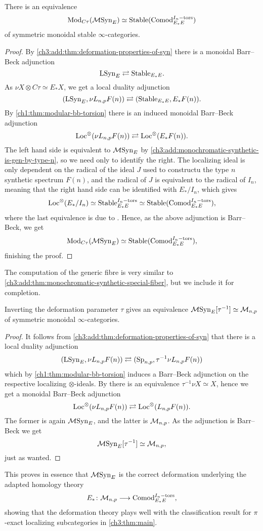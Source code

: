 \begin{theorem}
    \label{ch3:add:thm:monochromatic-synthetic-special-fiber}
    There is an equivalence
    \[\mathrm{Mod}_{C\tau}(\mathcal{M}\mathrm{Syn}_{E}) \simeq \mathrm{Stable}(\mathrm{Comod}_{E_*E}^{I_n-\mathrm{tors}})\]
    of symmetric monoidal stable $\infty$-categories. 
\end{theorem}
\begin{proof}
    By \cref{ch3:add:thm:deformation-properties-of-syn} there is a monoidal Barr--Beck adjunction 
    \[\mathrm{LSyn}_{E} \rightleftarrows \mathrm{Stable}_{E_*E}.\]
    As $\nu X \otimes C\tau \simeq E_{*} X$, we get a local duality adjunction 
    \[(\mathrm{LSyn}_{E}, \nu L_{n,p} F(n))\rightleftarrows (\mathrm{Stable}_{E_*E}, E_{*}F(n)).\]
    By \cref{ch1:thm:modular-bb-torsion} there is an induced monoidal Barr--Beck adjunction 
    \[\operatorname{Loc}^\otimes(\nu L_{n,p} F(n))\rightleftarrows \operatorname{Loc}^\otimes(E_{*}F(n)).\]
    The left hand side is equivalent to $\mathcal{M}\mathrm{Syn}_{E}$ by \cref{ch3:add:monochromatic-synthetic-is-gen-by-type-n}, so we need only to identify the right. The localizing ideal is only dependent on the radical of the ideal $J$ used to constructu the type $n$ synthetic spectrum $F(n)$, and the radical of $J$ is equivalent to the radical of $I_n$, meaning that the right hand side can be identified with $E_{*}/I_n$, which gives 
    \[\operatorname{Loc}^\otimes(E_{*}/I_n) \simeq \mathrm{Stable}_{E_*E}^{I_n-\mathrm{tors}}\simeq \mathrm{Stable}(\mathrm{Comod}_{E_*E}^{I_n-\mathrm{tors}}),\]
    where the last equivalence is due to \cite[3.17]{barthel-heard-valenzuela_2020}. Hence, as the above adjunction is Barr--Beck, we get 
    \[\mathrm{Mod}_{C\tau}(\mathcal{M}\mathrm{Syn}_{E}) \simeq \mathrm{Stable}(\mathrm{Comod}_{E_*E}^{I_n-\mathrm{tors}}),\]
    finishing the proof. 
\end{proof}

The computation of the generic fibre is very similar to \cref{ch3:add:thm:monochromatic-synthetic-special-fiber}, but we include it for completion. 

\begin{theorem}
    Inverting the deformation parameter $\tau$ gives an equivalence $\mathcal{M}\mathrm{Syn}_{E}[\tau^{-1}] \simeq \mathcal{M}_{n,p}$ of symmetric monoidal $\infty$-categories. 
\end{theorem}
\begin{proof}
    It follows from \cref{ch3:add:thm:deformation-properties-of-syn} that there is a local duality adjunction 
    \[(\mathrm{LSyn}_{E}, \nu L_{n,p} F(n)) \rightleftarrows (\mathrm{Sp}_{n,p}, \tau^{-1}\nu L_{n,p} F(n))\]
    which by \cref{ch1:thm:modular-bb-torsion} induces a Barr--Beck adjunction on the respective localizing $\otimes$-ideals. By \cite[4.40]{pstragowski_2022} there is an equivalence $\tau^{-1}\nu X \simeq X$, hence we get a monoidal Barr--Beck adjunction 
    \[\operatorname{Loc}^\otimes(\nu L_{n,p} F(n))\rightleftarrows \operatorname{Loc}^\otimes(L_{n,p} F(n)).\]
    The former is again $\mathcal{M}\mathrm{Syn}_{E}$, and the latter is $\mathcal{M}_{n,p}$. As the adjunction is Barr--Beck we get 
    \[\mathcal{M}\mathrm{Syn}_{E}[\tau^{-1}]\simeq \mathcal{M}_{n,p},\]
    just as wanted. 
\end{proof}

This proves in essence that $\mathcal{M}\mathrm{Syn}_{E}$ is the correct deformation underlying the adapted homology theory 
\[E_*\colon \mathcal{M}_{n,p} \longrightarrow \mathrm{Comod}_{E_*E}^{I_n-\mathrm{tors}},\] 
showing that the deformation theory plays well with the classification result for $\pi$-exact localizing subcategories in \cref{ch3:thm:main}. 






